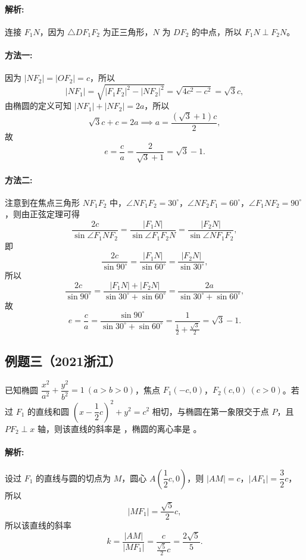 \documentclass{article}
\begin{document}
\paragraph{解析:}
连接 \(F_1N\)，因为 \(\triangle DF_1F_2\) 为正三角形，\(N\) 为 \(DF_2\) 的中点，所以 \(F_1N \perp F_2N\)。
\paragraph{方法一:}
因为 \(|NF_2| = |OF_2| = c\)，所以
\[
|NF_1| = \sqrt{|F_1F_2|^2 - |NF_2|^2} = \sqrt{4c^2 - c^2} = \sqrt{3}c,
\]
由椭圆的定义可知 \(|NF_1| + |NF_2| = 2a\)，所以
\[
\sqrt{3}c + c = 2a \implies a = \frac{(\sqrt{3} + 1)c}{2},
\]
故
\[
e = \frac{c}{a} = \frac{2}{\sqrt{3} + 1} = \sqrt{3} - 1.
\]

\paragraph{方法二:}
注意到在焦点三角形 \(NF_1F_2\) 中，\(\angle NF_1F_2 = 30^\circ\)，\(\angle NF_2F_1 = 60^\circ\)，\(\angle F_1NF_2 = 90^\circ\)，则由正弦定理可得
\[
\frac{2c}{\sin \angle F_1NF_2} = \frac{|F_1N|}{\sin \angle F_1F_2N} = \frac{|F_2N|}{\sin \angle NF_1F_2},
\]
即
\[
\frac{2c}{\sin 90^\circ} = \frac{|F_1N|}{\sin 60^\circ} = \frac{|F_2N|}{\sin 30^\circ},
\]
所以
\[
\frac{2c}{\sin 90^\circ} = \frac{|F_1N| + |F_2N|}{\sin 30^\circ + \sin 60^\circ} = \frac{2a}{\sin 30^\circ + \sin 60^\circ},
\]
故
\[
e = \frac{c}{a} = \frac{\sin 90^\circ}{\sin 30^\circ + \sin 60^\circ} = \frac{1}{\frac{1}{2} + \frac{\sqrt{3}}{2}} = \sqrt{3} - 1.
\]


\vspace{1em}

\subsection*{例题三（2021浙江）}
已知椭圆 \(\dfrac{x^2}{a^2} + \dfrac{y^2}{b^2} = 1\ (a > b > 0)\)，焦点 \(F_1(-c,0)\)，\(F_2(c,0)\ (c > 0)\)。若过 \(F_1\) 的直线和圆 \(\left(x - \dfrac{1}{2}c\right)^2 + y^2 = c^2\) 相切，与椭圆在第一象限交于点 \(P\)，且 \(PF_2 \perp x\) 轴，则该直线的斜率是 \underline{\quad\quad\quad}，椭圆的离心率是 \underline{\quad\quad\quad}。

\paragraph{解析:}
设过 \(F_1\) 的直线与圆的切点为 \(M\)，圆心 \(A\left(\dfrac{1}{2}c,0\right)\)，则 \(|AM| = c\)，\(|AF_1| = \dfrac{3}{2}c\)，所以
\[
|MF_1| = \frac{\sqrt{5}}{2}c,
\]
所以该直线的斜率
\[
k = \frac{|AM|}{|MF_1|} = \frac{c}{\frac{\sqrt{5}}{2}c} = \frac{2\sqrt{5}}{5}.
\]
\end{document}
